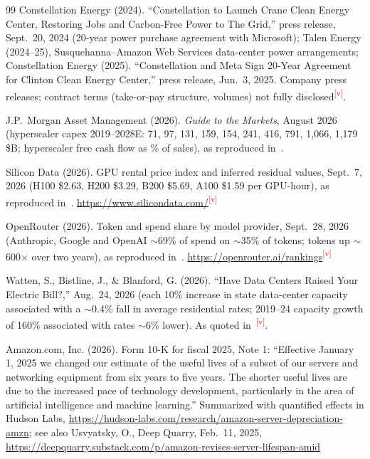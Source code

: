 \documentclass[11pt,letterpaper]{article}
\newcommand{\verify}{\textsuperscript{\textcolor{red}{[v]}}}
\begin{document}
\begin{thebibliography}{99}
Constellation Energy (2024). ``Constellation to Launch Crane Clean Energy Center, Restoring Jobs and Carbon-Free Power to The Grid,'' press release, Sept.~20, 2024 (20-year power purchase agreement with Microsoft); Talen Energy (2024--25), Susquehanna--Amazon Web Services data-center power arrangements; Constellation Energy (2025). ``Constellation and Meta Sign 20-Year Agreement for Clinton Clean Energy Center,'' press release, Jun.~3, 2025. Company press releases; contract terms (take-or-pay structure, volumes) not fully disclosed\verify.

J.P.~Morgan Asset Management (2026). \textit{Guide to the Markets}, August 2026 (hyperscaler capex 2019--2028E: 71, 97, 131, 159, 154, 241, 416, 791, 1,066, 1,179 \$B; hyperscaler free cash flow as \% of sales), as reproduced in~\cite{ref:a16z_som}.

Silicon Data (2026). GPU rental price index and inferred residual values, Sept.~7, 2026 (H100 \$2.63, H200 \$3.29, B200 \$5.69, A100 \$1.59 per GPU-hour), as reproduced in~\cite{ref:a16z_som}. \url{https://www.silicondata.com/}\verify

OpenRouter (2026). Token and spend share by model provider, Sept.~28, 2026 (Anthropic, Google and OpenAI $\sim$69\% of spend on $\sim$35\% of tokens; tokens up $\sim$600$\times$ over two years), as reproduced in~\cite{ref:a16z_som}. \url{https://openrouter.ai/rankings}\verify

Watten, S., Bistline, J., \& Blanford, G. (2026). ``Have Data Centers Raised Your Electric Bill?,'' Aug.~24, 2026 (each 10\% increase in state data-center capacity associated with a $\sim$0.4\% fall in average residential rates; 2019--24 capacity growth of 160\% associated with rates $\sim$6\% lower). As quoted in~\cite{ref:a16z_som}\verify.

Amazon.com, Inc. (2026). Form 10-K for fiscal 2025, Note 1: ``Effective January 1, 2025 we changed our estimate of the useful lives of a subset of our servers and networking equipment from six years to five years. The shorter useful lives are due to the increased pace of technology development, particularly in the area of artificial intelligence and machine learning.'' Summarized with quantified effects in Hudson Labs, \url{https://hudson-labs.com/research/amazon-server-depreciation-amzn}; see also Usvyatsky, O., Deep Quarry, Feb.~11, 2025, \url{https://deepquarry.substack.com/p/amazon-revises-server-lifespan-amid}


\end{thebibliography}
\end{document}
